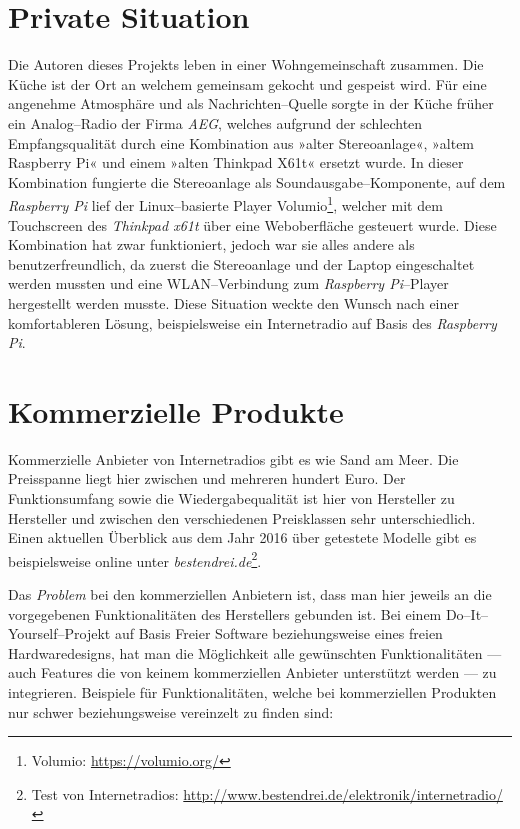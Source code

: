 \documentclass[11pt,ngerman,toc=listof,index=totoc]{scrreprt}
\begin{document}
\section{Private Situation}\label{private-situation}

Die Autoren dieses Projekts leben in einer Wohngemeinschaft zusammen.
Die Küche ist der Ort an welchem gemeinsam gekocht und gespeist wird.
Für eine angenehme Atmosphäre und als Nachrichten--Quelle sorgte in der
Küche früher ein Analog--Radio der Firma \emph{AEG}, welches aufgrund
der schlechten Empfangsqualität durch eine Kombination aus »alter
Stereoanlage«, »altem Raspberry Pi« und einem »alten Thinkpad X61t«
ersetzt wurde. In dieser Kombination fungierte die Stereoanlage als
Soundausgabe--Komponente, auf dem \emph{Raspberry Pi} lief der
Linux--basierte Player Volumio\footnote{Volumio:
  \url{https://volumio.org/}}, welcher mit dem Touchscreen des
\emph{Thinkpad x61t} über eine Weboberfläche gesteuert wurde. Diese
Kombination hat zwar funktioniert, jedoch war sie alles andere als
benutzerfreundlich, da zuerst die Stereoanlage und der Laptop
eingeschaltet werden mussten und eine WLAN--Verbindung zum
\emph{Raspberry Pi}--Player hergestellt werden musste. Diese Situation
weckte den Wunsch nach einer komfortableren Lösung, beispielsweise ein
Internetradio auf Basis des \emph{Raspberry Pi}.

\section{Kommerzielle Produkte}\label{kommerzielle-produkte}

Kommerzielle Anbieter von Internetradios gibt es wie Sand am Meer. Die
Preisspanne liegt hier zwischen  und mehreren hundert Euro. Der
Funktionsumfang sowie die Wiedergabequalität ist hier von Hersteller zu
Hersteller und zwischen den verschiedenen Preisklassen sehr
unterschiedlich. Einen aktuellen Überblick aus dem Jahr 2016 über
getestete Modelle gibt es beispielsweise online unter
\emph{bestendrei.de}\footnote{Test von Internetradios:
  \url{http://www.bestendrei.de/elektronik/internetradio/}}.

Das \emph{Problem} bei den kommerziellen Anbietern ist, dass man hier
jeweils an die vorgegebenen Funktionalitäten des Herstellers gebunden
ist. Bei einem Do--It--Yourself--Projekt auf Basis Freier Software
beziehungsweise eines freien Hardwaredesigns, hat man die Möglichkeit
alle gewünschten Funktionalitäten --- auch Features die von keinem
kommerziellen Anbieter unterstützt werden --- zu integrieren. Beispiele
für Funktionalitäten, welche bei kommerziellen Produkten nur schwer
beziehungsweise vereinzelt zu finden sind:
\end{document}
